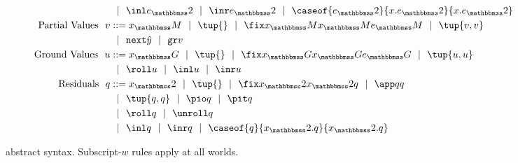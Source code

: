\begin{figure}
\begin{abstrsyn}
\[\begin{aligned}
&\gbar \inl \exprT \gbar \inr \exprT
 \gbar \caseof {\exprT}{\var.\exprT}{\var.\exprT} \\ 
\text{Partial Values}\ \ 
v &::= \varM
 \gbar\tup{}
 \gbar \fix \varM \varM \exprM
 \gbar \tup{v, v} \\
&\gbar \next {\hat y} 
 \gbar \pure v \\
\text{Ground Values}\ \ 
u &::= \varG
 \gbar\tup{}
 \gbar \fix \varG \varG \exprG
 \gbar \tup{u, u} \\
&\gbar \roll u
 \gbar \inl u 
 \gbar \inr u \\
\text{Residuals}\ \ 
q &::= \varT
 \gbar \tup{}
 \gbar \fix \varT \varT q
 \gbar \app q q \\
&\gbar \tup{q, q} 
 \gbar \pio q 
 \gbar \pit q \\
&\gbar \roll q
 \gbar \unroll q\\
&\gbar \inl q 
 \gbar \inr q
 \gbar \caseof {q}{\varT.q}{\varT.q} \\
\end{aligned}\]
\end{abstrsyn}
\caption{\lang\ abstract syntax. Subscript-$w$ rules apply at all worlds.}
\label{fig:grammar}
\end{figure}
